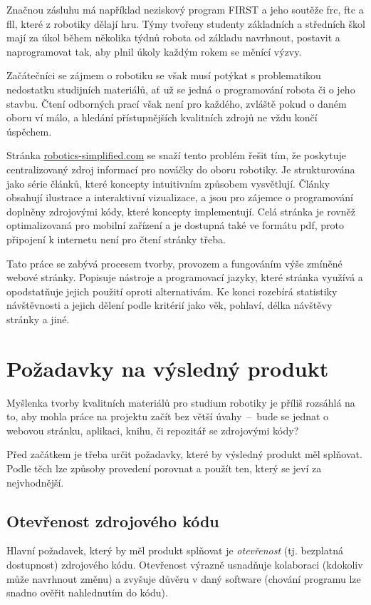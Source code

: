 \documentclass[a4paper, 12pt]{article}
\begin{document}
  Značnou zásluhu má například neziskový program FIRST a jeho soutěže \gls{frc}, \gls{ftc} a \gls{fll}, které z robotiky dělají hru. Týmy tvořeny studenty základních a středních škol mají za úkol během několika týdnů robota od základu navrhnout, postavit a naprogramovat tak, aby plnil úkoly každým rokem se měnící výzvy.

  Začátečníci se zájmem o robotiku se však musí potýkat s problematikou nedostatku studijních materiálů, ať už se jedná o programování robota či o jeho stavbu. Čtení odborných prací však není pro každého, zvláště pokud o daném oboru ví málo, a hledání přístupnějších kvalitních zdrojů ne vždu končí úspěchem.

  Stránka \url{robotics-simplified.com} se snaží tento problém řešit tím, že poskytuje centralizovaný zdroj informací pro nováčky do oboru robotiky. Je strukturována jako série článků, které koncepty intuitivním způsobem vysvětlují. Články obsahují ilustrace a interaktivní vizualizace, a jsou pro zájemce o programování doplněny zdrojovými kódy, které koncepty implementují. Celá stránka je rovněž optimalizovaná pro mobilní zařízení a je dostupná také ve formátu \gls{pdf}, proto připojení k internetu není pro čtení stránky třeba.

  Tato práce se zabývá procesem tvorby, provozem a fungováním výše zmíněné webové stránky. Popisuje nástroje a programovací jazyky, které stránka využívá a opodstatňuje jejich použití oproti alternativám. Ke konci rozebírá statistiky návštěvnosti a jejich dělení podle kritérií jako věk, pohlaví, délka návštěvy stránky a jiné.

  \newpage

  \section{Požadavky na výsledný produkt} \label{sec:Požadavky na výsledný produkt}
  Myšlenka tvorby kvalitních materiálů pro studium robotiky je příliš rozsáhlá na to, aby mohla práce na projektu začít bez větší úvahy~--~bude se jednat o webovou stránku, aplikaci, knihu, či repozitář se zdrojovými kódy?

  Před začátkem je třeba určit požadavky, které by výsledný produkt měl splňovat. Podle těch lze způsoby provedení porovnat a použít ten, který se jeví za nejvhodnější.


  \subsection{Otevřenost zdrojového kódu}
  Hlavní požadavek, který by měl produkt splňovat je \emph{otevřenost} (tj. bezplatná dostupnost) zdrojového kódu. Otevřenost výrazně usnadňuje kolaboraci (kdokoliv může navrhnout změnu) a zvyšuje důvěru v daný software (chování programu lze snadno ověřit nahlednutím do kódu).
\end{document}
